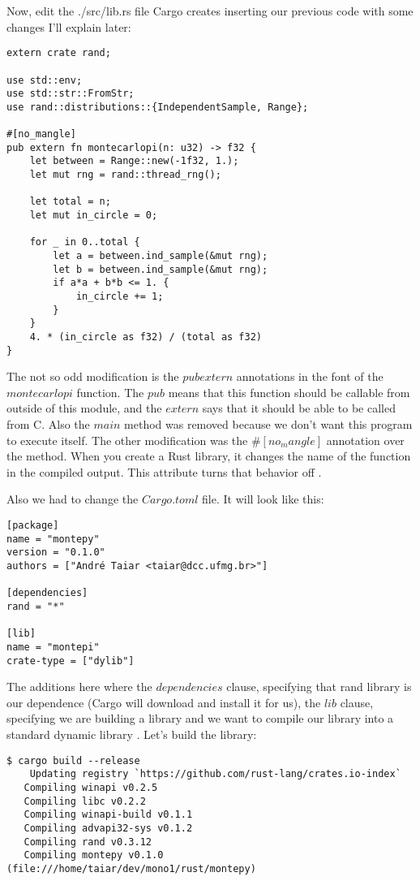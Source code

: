 Now, edit the ./src/lib.rs file Cargo creates inserting our previous code with
some changes I'll explain later:

\begin{lstlisting}[label=rlllabrar,caption=Rust library code]
extern crate rand;

use std::env;
use std::str::FromStr;
use rand::distributions::{IndependentSample, Range};

#[no_mangle]
pub extern fn montecarlopi(n: u32) -> f32 {
    let between = Range::new(-1f32, 1.);
    let mut rng = rand::thread_rng();

    let total = n;
    let mut in_circle = 0;

    for _ in 0..total {
        let a = between.ind_sample(&mut rng);
        let b = between.ind_sample(&mut rng);
        if a*a + b*b <= 1. {
            in_circle += 1;
        }
    }
    4. * (in_circle as f32) / (total as f32)
}
\end{lstlisting}

The not so odd modification is the $pub extern$ annotations in the font of
the $montecarlopi$ function. The $pub$ means that this function should be
callable from outside of this module, and the $extern$ says that it should be
able to be called from C. Also the $main$ method was removed because we don't
want this program to execute itself. The other modification was the $\#[no_mangle]$ annotation over the method. When you create a Rust library, it
changes the name of the function in the compiled output. This attribute turns
that behavior off  \cite{8_2}.

Also we had to change the $Cargo.toml$ file. It will look like this:

\begin{verbatim}
[package]
name = "montepy"
version = "0.1.0"
authors = ["André Taiar <taiar@dcc.ufmg.br>"]

[dependencies]
rand = "*"

[lib]
name = "montepi"
crate-type = ["dylib"]
\end{verbatim}

The additions here where the $dependencies$ clause, specifying that rand library
is our dependence (Cargo will download and install it for us), the $lib$ clause,
specifying we are building a library and we want to compile our library into a
standard dynamic library  \cite{8_3}. Let's build
the library:

\begin{verbatim}
$ cargo build --release
    Updating registry `https://github.com/rust-lang/crates.io-index`
   Compiling winapi v0.2.5
   Compiling libc v0.2.2
   Compiling winapi-build v0.1.1
   Compiling advapi32-sys v0.1.2
   Compiling rand v0.3.12
   Compiling montepy v0.1.0 (file:///home/taiar/dev/mono1/rust/montepy)
\end{verbatim}

